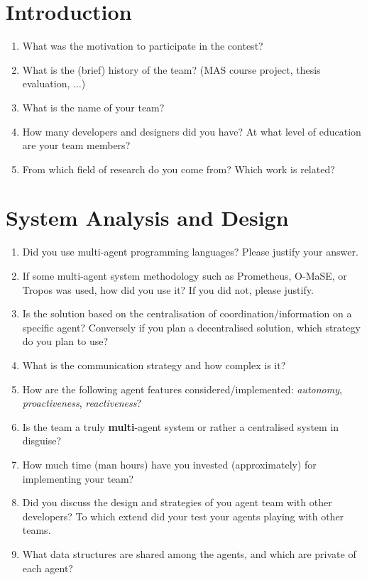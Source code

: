 \documentclass{llncs}
\begin{document}
\section{Introduction}

\begin{enumerate}
\item What was the motivation to participate in the contest?
\item What is the (brief) history of the team? (MAS course project,
  thesis evaluation, $\ldots$)
\item What is the name of your team?
\item How many developers and designers did you have? At what level of education are your team members?
\item From which field of research do you come from? Which work is related?
\end{enumerate}

\section{System Analysis and Design}

\begin{enumerate}
 \item Did you use multi-agent programming languages? Please justify your answer.
 \item If some multi-agent system methodology such as Prometheus,
   O-MaSE, or Tropos was used, how did you use it? If you did not, please justify.
 \item Is the solution based on the centralisation of
   coordination/information on a specific agent? Conversely if you
   plan a decentralised solution, which strategy do you plan to use?
 \item What is the communication strategy and how complex is it?
 \item How are the following agent features considered/implemented:
   \emph{autonomy}, \emph{proactiveness}, \emph{reactiveness}?
 \item Is the team a truly \textbf{multi}-agent system or rather a
   centralised system in disguise?
\item How much time (man hours) have you invested (approximately) for implementing your team?
\item Did you discuss the design and strategies of you agent team with other developers? To which extend did your test your agents playing with other teams.
\item What data structures are shared among the agents, and which are private of each agent?
\end{enumerate}
\end{document}
